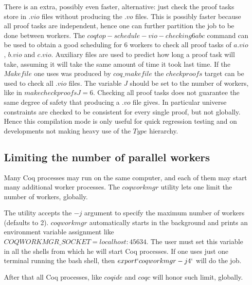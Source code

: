 There is an extra, possibly even faster, alternative: just check
the proof tasks store in $.vio$ files without producing the $.vo$ files.
This is possibly faster because all proof tasks are independent, hence
one can further partition the job to be done between workers.
The $coqtop -schedule-vio-checking 6 a b c$ command can be used to obtain
a good scheduling for 6 workers to check all proof tasks of $a.vio$, $b.vio$ and
$c.vio$.  Auxiliary files are used to predict how long a proof task will take,
assuming it will take the same amount of time it took last time.
If the $Makefile$ one uses was produced by $coq\_makefile$ the $checkproofs$
target can be used to check all $.vio$ files.  The variable $J$ should be
set to the number of workers, like in $make checkproofs J=6$.
Checking all proof tasks does not guarantee the same degree of safety
that producing a $.vo$ file gives.  In particular universe constraints
are checked to be consistent for every single proof, but not globally.
Hence this compilation mode is only useful for quick regression testing
and on developments not making heavy use of the $Type$ hierarchy.

\subsection{Limiting the number of parallel workers}
\label{coqworkmgr}

Many Coq processes may run on the same computer, and each of them may start
many additional worker processes. 
The $coqworkmgr$ utility lets one limit the number of workers, globally.

The utility accepts the $-j$ argument to specify the maximum number of
workers (defaults to 2).  $coqworkmgr$ automatically starts in the
background and prints an environment variable assignment like
$COQWORKMGR\_SOCKET=localhost:45634$.  The user must set this variable in
all the shells from which he will start Coq processes.  If one uses just
one terminal running the bash shell, then $export `coqworkmgr -j 4`$ will
do the job.

After that all Coq processes, like $coqide$ and $coqc$ will honor such
limit, globally.


